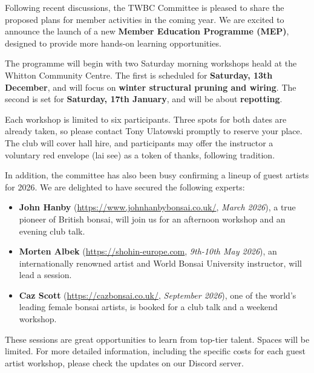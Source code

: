 \noindent
Following recent discussions, the TWBC Committee is pleased to share the proposed plans for member activities in the coming year.
We are excited to announce the launch of a new \textbf{Member Education Programme (MEP)}, designed to provide more hands\--on learning opportunities.

The programme will begin with two Saturday morning workshops heald at the Whitton Community Centre.
The first is scheduled for \textbf{Saturday, 13th December}, and will focus on \textbf{winter structural pruning and wiring}.
The second is set for \textbf{Saturday, 17th January}, and will be about \textbf{repotting}.

Each workshop is limited to six participants.
Three spots for both dates are already taken, so please contact Tony Ulatowski promptly to reserve your place.
The club will cover hall hire, and participants may offer the instructor a voluntary red envelope (lai see) as a token of thanks, following tradition.

In addition, the committee has also been busy confirming a lineup of guest artists for 2026.
We are delighted to have secured the following experts:

\begin{itemize}
    \item \textbf{John Hanby} (\url{https://www.johnhanbybonsai.co.uk/}, \textit{March 2026}), a true pioneer of British bonsai, will join us for an afternoon workshop and an evening club talk.

    \item \textbf{Morten Albek} (\url{https://shohin-europe.com}, \textit{9th-10th May 2026}), an internationally renowned artist and World Bonsai University instructor, will lead a session.

    \item \textbf{Caz Scott} (\url{https://cazbonsai.co.uk/}, \textit{September 2026}), one of the world's leading female bonsai artists, is booked for a club talk and a weekend workshop.
\end{itemize}

These sessions are great opportunities to learn from top\--tier talent.
Spaces will be limited.
For more detailed information, including the specific costs for each guest artist workshop, please check the updates on our Discord server.

